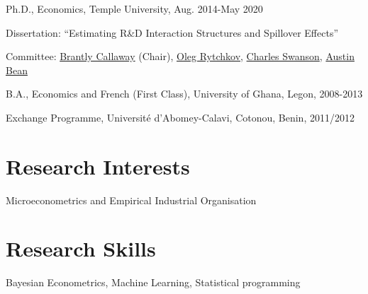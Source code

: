 \documentclass[12pt,letterpaper]{article}
\renewenvironment{itemize}{
  \begin{list}{}{
    \setlength{\leftmargin}{1.5em}
  }
}{
  \end{list}
}
\begin{document}
\begin{itemize}
  \item Ph.D., Economics, Temple University, Aug. 2014-May 2020
  \begin{itemize}
    \item Dissertation: ``Estimating R\&D Interaction Structures and Spillover Effects''
    \item Committee:   \href{https://bcallaway11.github.io/index.html}
    {Brantly Callaway} (Chair), \href{https://astro.temple.edu/~rytchkov/}{Oleg Rytchkov}, \href{https://liberalarts.temple.edu/academics/faculty/swanson-charles}{Charles Swanson}, \href{https://liberalarts.temple.edu/academics/faculty/bean-austin}{Austin Bean} 
  \end{itemize}


  \item B.A., Economics and French (First Class), University of Ghana, Legon, 2008-2013
  \item  Exchange Programme, Universit\'{e} d'Abomey-Calavi, Cotonou, Benin, 2011/2012
\end{itemize}

\section*{Research Interests}
\begin{itemize}
  \item Microeconometrics and Empirical Industrial Organisation
\end{itemize}

\section*{Research Skills}
\begin{itemize}
	\item Bayesian Econometrics, Machine Learning, Statistical programming
\end{itemize}
\end{document}
